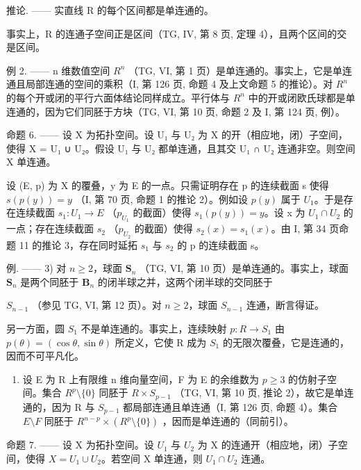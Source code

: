 推论. —— 实直线 R 的每个区间都是单连通的。

事实上，R 的连通子空间正是区间（TG, IV, 第 8 页, 定理 4），且两个区间的交是区间。

例 2. —— n 维数值空间 \(R^{n}\) （TG, VI, 第 1 页）是单连通的。事实上，它是单连通且局部连通的空间的乘积（I, 第 126 页, 命题 4 及上文命题 5 的推论）。对 \(R^{n}\) 的每个开或闭的平行六面体结论同样成立。平行体与 \(R^{n}\) 中的开或闭欧氏球都是单连通的，因为它们同胚于方块（TG, VI, 第 10 页, 命题 2 及 I, 第 124 页, 例）。

命题 6. —— 设 X 为拓扑空间。设 U₁ 与 U₂ 为 X 的开（相应地，闭）子空间，使得 X = U₁ ∪ U₂。假设 U₁ 与 U₂ 都单连通，且其交 U₁ ∩ U₂ 连通非空。则空间 X 单连通。

设 (E, p) 为 X 的覆叠，y 为 E 的一点。只需证明存在 p 的连续截面 s 使得 \(s(p(y)) = y\) （I, 第 70 页, 命题 1 的推论 2）。例如设 \(p(y)\) 属于 \(U_{1}\)。于是存在连续截面 \(s_{1}: U_{1} \to E\) （\(p_{U_{1}}\) 的截面）使得 \(s_{1}(p(y)) = y\)。设 x 为 \(U_{1} \cap U_{2}\) 的一点；存在连续截面 \(s_{2}\) （\(p_{U_{2}}\) 的截面）使得 \(s_{2}(x) = s_{1}(x)\)。由 I, 第 34 页命题 11 的推论 3，存在同时延拓 \(s_{1}\) 与 \(s_{2}\) 的 p 的连续截面 s。

例. —— 3) 对 \(n \geqslant 2\)，球面 \(\mathbf{S}_{n}\) （TG, VI, 第 10 页）是单连通的。事实上，球面 \(\mathbf{S}_{n}\) 是两个同胚于 \(\mathbf{B}_{n}\) 的闭半球之并，这两个闭半球的交同胚于

\(S_{n-1}\) （参见 TG, VI, 第 12 页）。对 \(n \geqslant 2\)，球面 \(S_{n-1}\) 连通，断言得证。

另一方面，圆 \(S_{1}\) 不是单连通的。事实上，连续映射 \(p: R \to S_{1}\) 由 \(p(\theta) = (\cos \theta, \sin \theta)\) 所定义，它使 R 成为 \(S_{1}\) 的无限次覆叠，它是连通的，因而不可平凡化。

\begin{enumerate}
\def\labelenumi{\arabic{enumi})}
\setcounter{enumi}{3}
\tightlist
\item
  设 E 为 R 上有限维 n 维向量空间，F 为 E 的余维数为 \(p \geqslant 3\) 的仿射子空间。集合 \(R^{p}\setminus\{0\}\) 同胚于 \(R \times S_{p-1}\) （TG, VI, 第 10 页, 推论 2），故它是单连通的，因为 R 与 \(S_{p-1}\) 都局部连通且单连通（I, 第 126 页, 命题 4）。集合 \(E\setminus F\) 同胚于 \(R^{n-p} \times (R^{p}\setminus\{0\})\) ，因而是单连通的（同前引）。
\end{enumerate}

命题 7. —— 设 X 为拓扑空间。设 \(U_{1}\) 与 \(U_{2}\) 为 X 的连通开（相应地，闭）子空间，使得 \(X = U_{1} \cup U_{2}\)。若空间 X 单连通，则 \(U_{1} \cap U_{2}\) 连通。

